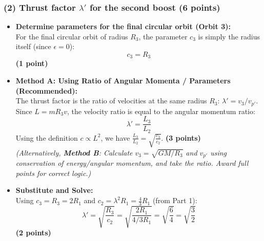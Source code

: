 \documentclass[11pt, a4paper]{article} %
\begin{document}
\subsubsection*{(2) Thrust factor $\lambda'$ for the second boost (6 points)}
\begin{itemize}
    \item \textbf{Determine parameters for the final circular orbit (Orbit 3):} \\
    For the final circular orbit of radius $R_3$, the parameter $c_3$ is simply the radius itself (since $\epsilon=0$):
    \[
    c_3 = R_3
    \]
    \hfill \textbf{(1 point)}

    \item \textbf{Method A: Using Ratio of Angular Momenta / Parameters (Recommended):} \\
    The thrust factor is the ratio of velocities at the same radius $R_3$: $\lambda' = v_3 / v_{p'}$.
    Since $L = m R_3 v$, the velocity ratio is equal to the angular momentum ratio:
    \[
    \lambda' = \frac{L_3}{L_2}
    \]
    Using the definition $c \propto L^2$, we have $\frac{L_3}{L_2} = \sqrt{\frac{c_3}{c_2}}$.
    \hfill \textbf{(3 points)} \\
    \textit{(Alternatively, \textbf{Method B}: Calculate $v_3 = \sqrt{GM/R_3}$ and $v_{p'}$ using conservation of energy/angular momentum, and take the ratio. Award full points for correct logic.)}

    \item \textbf{Substitute and Solve:} \\
    Using $c_3 = R_3 = 2R_1$ and $c_2 = \lambda^2 R_1 = \frac{4}{3}R_1$ (from Part 1):
    \[
    \lambda' = \sqrt{\frac{R_3}{c_2}} = \sqrt{\frac{2R_1}{4/3 R_1}} = \sqrt{\frac{6}{4}} = \sqrt{\frac{3}{2}}
    \]
    \hfill \textbf{(2 points)} \\
\end{itemize}

\end{document}
